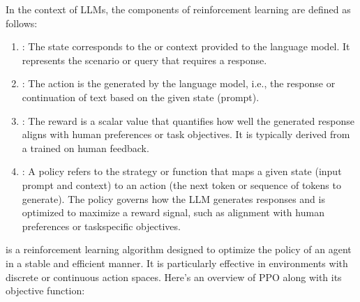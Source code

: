 \documentclass[letterpaper,11pt,english]{sphinxmanual}
\begin{document}
\sphinxAtStartPar
In the context of LLMs, the components of reinforcement learning are
defined as follows:
\begin{enumerate}
%
\item {} 
\sphinxAtStartPar
{}: The state corresponds to the  or context
provided to the language model. It represents the scenario or query
that requires a response.

\item {} 
\sphinxAtStartPar
{}: The action is the  generated by the language
model, i.e., the response or continuation of text based on the given
state (prompt).

\item {} 
\sphinxAtStartPar
{}: The reward is a scalar value that quantifies how well the
generated response aligns with human preferences or task objectives.
It is typically derived from a  trained on human
feedback.

\item {} 
\sphinxAtStartPar
{}: A policy refers to the strategy or function that maps a
given state (input prompt and context) to an action (the next token
or sequence of tokens to generate). The policy governs how the LLM
generates responses and is optimized to maximize a reward signal,
such as alignment with human preferences or task\sphinxhyphen{}specific objectives.

\end{enumerate}

\sphinxAtStartPar
{} is a reinforcement learning
algorithm designed to optimize the policy of an agent in a stable and
efficient manner. It is particularly effective in environments with
discrete or continuous action spaces. Here’s an overview of PPO along
with its objective function:

\sphinxAtStartPar
{}
\end{document}
